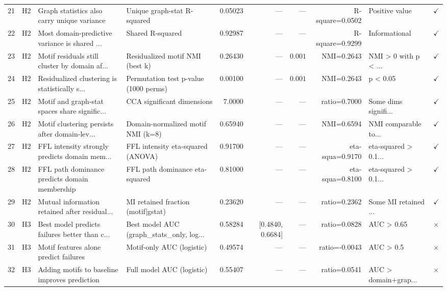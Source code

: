 \documentclass[11pt,a4paper]{article}
\begin{document}
\begin{landscape}
\begin{longtable}{rlp{3.2cm}p{3cm}rrrrp{1.5cm}l}
\rowcolor{rowgray}
21 & H2 & Graph statistics also carry unique variance & Unique graph-stat R-squared & 0.05023 & --- & --- & R-square=0.0502 & Positive value & $\checkmark$ \\
22 & H2 & Most domain-predictive variance is shared ... & Shared R-squared & 0.92987 & --- & --- & R-square=0.9299 & Informational & $\checkmark$ \\
\rowcolor{rowgray}
23 & H2 & Motif residuals still cluster by domain af... & Residualized motif NMI (best k) & 0.26430 & --- & $0.001$ & NMI=0.2643 & NMI \textgreater{} 0 with p \textless{} ... & $\checkmark$ \\
24 & H2 & Residualized clustering is statistically s... & Permutation test p-value (1000 perms) & 0.00100 & --- & $0.001$ & NMI=0.2643 & p \textless{} 0.05 & $\checkmark$ \\
\rowcolor{rowgray}
25 & H2 & Motif and graph-stat spaces share signific... & CCA significant dimensions & 7.0000 & --- & --- & ratio=0.7000 & Some dims signifi... & $\checkmark$ \\
26 & H2 & Motif clustering persists after domain-lev... & Domain-normalized motif NMI (k=8) & 0.65940 & --- & --- & NMI=0.6594 & NMI comparable to... & $\checkmark$ \\
\rowcolor{rowgray}
27 & H2 & FFL intensity strongly predicts domain mem... & FFL intensity eta-squared (ANOVA) & 0.91700 & --- & --- & eta-squa=0.9170 & eta-squared \textgreater{} 0.1... & $\checkmark$ \\
28 & H2 & FFL path dominance predicts domain membership & FFL path dominance eta-squared & 0.81000 & --- & --- & eta-squa=0.8100 & eta-squared \textgreater{} 0.1... & $\checkmark$ \\
\rowcolor{rowgray}
29 & H2 & Mutual information retained after residual... & MI retained fraction (motif|gstat) & 0.23620 & --- & --- & ratio=0.2362 & Some MI retained ... & $\checkmark$ \\
\midrule
30 & H3 & Best model predicts failures better than c... & Best model AUC (graph\_stats\_only, log... & 0.58284 & [0.4840, 0.6684] & --- & ratio=0.0828 & AUC \textgreater{} 0.65 & $\times$ \\
\rowcolor{rowgray}
31 & H3 & Motif features alone predict failures & Motif-only AUC (logistic) & 0.49574 & --- & --- & ratio=-0.0043 & AUC \textgreater{} 0.5 & $\times$ \\
32 & H3 & Adding motifs to baseline improves prediction & Full model AUC (logistic) & 0.55407 & --- & --- & ratio=0.0541 & AUC \textgreater{} domain+grap... & $\times$ \\

\end{longtable}
\end{landscape}
\end{document}
